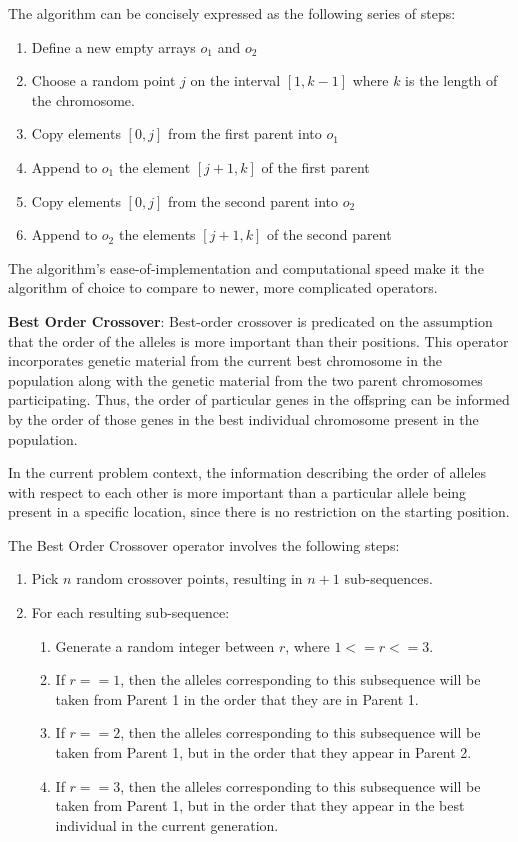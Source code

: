 \documentclass[12pt,twocolumn,oneside]{osajnl}
\begin{document}
The algorithm can be concisely expressed as the following series of steps:
\begin{enumerate}
    \item Define a new empty arrays $o_1$ and $o_2$
    \item Choose a random point $j$ on the interval $[1, k-1]$ where $k$ is the length of the chromosome.
    \item Copy elements $[0, j]$ from the first parent into $o_1$
    \item Append to $o_1$ the element $[j+1, k]$ of the first parent
    \item Copy elements $[0, j]$ from the second parent into $o_2$
    \item Append to $o_2$ the elements $[j+1, k]$ of the second parent
\end{enumerate}

The algorithm's ease-of-implementation and computational speed make it the algorithm of choice to compare to newer, more complicated operators.

\textbf{Best Order Crossover}: Best-order crossover is predicated on the assumption that the order of the alleles is more important than their positions. This operator incorporates genetic material from the current best chromosome in the population along with the genetic material from the two parent chromosomes participating. Thus, the order of particular genes in the offspring can be informed by the order of those genes in the best individual chromosome present in the population\cite{andreica2015best}.

In the current problem context, the information describing the order of alleles with respect to each other is more important than a particular allele being present in a specific location, since there is no restriction on the starting position.

The Best Order Crossover operator involves the following steps:
\begin{enumerate}
    \item Pick $n$ random crossover points, resulting in $n+1$ sub-sequences.
    \item For each resulting sub-sequence:
    \begin{enumerate}
        \item Generate a random integer between $r$, where $1 <= r <= 3$.
        \item If $r == 1$, then the alleles corresponding to this subsequence will be taken from Parent 1 in the order that they are in Parent 1.
        \item If $r == 2$, then the alleles corresponding to this subsequence will be taken from Parent 1, but in the order that they appear in Parent 2.
        \item If $r == 3$, then the alleles corresponding to this subsequence will be taken from Parent 1, but in the order that they appear in the best individual in the current generation.
    \end{enumerate}
\end{enumerate}
\end{document}
